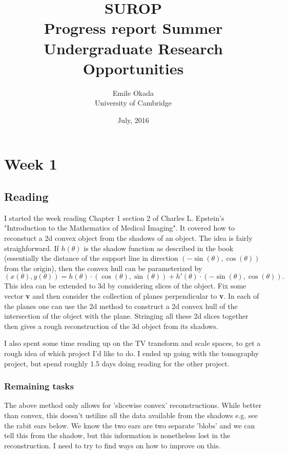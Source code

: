 \documentclass[a4paper]{article}
\begin{document}
\title{
    SUROP \\ Progress report
}
\title{Summer Undergraduate Research Opportunities}
\date{July, 2016}
\author{Emile Okada \\ University of Cambridge}
\maketitle

\newpage

\setcounter{section}{0}
\section{Week 1}
\subsection{Reading}
I started the week reading Chapter 1 section 2 of Charles L. Epstein's "Introduction to the Mathematics of Medical Imaging".
It covered how to reconstuct a 2d convex object from the shadows of an object. 
The idea is fairly straighforward. 
If $h(\theta)$ is the shadow function as described in the book (essentially the distance of the support line in direction $(-\sin(\theta),\cos(\theta))$ from the origin), then the convex hull can be parameterized by
\begin{equation}
    (x(\theta),y(\theta)) = h(\theta)\cdot(\cos(\theta),\sin(\theta))+h'(\theta)\cdot(-\sin(\theta),\cos(\theta)).
\end{equation}
This idea can be extended to 3d by considering slices of the object. 
Fix some vector {\bfseries v} and then consider the collection of planes perpendicular to {\bfseries v}. 
In each of the planes one can use the 2d method to construct a 2d convex hull of the intersection of the object with the plane. 
Stringing all these 2d slices together then gives a rough reconstruction of the 3d object from its shadows.

I also spent some time reading up on the TV transform and scale spaces, to get a rough idea of which project I'd like to do. 
I ended up going with the tomography project, but spend roughly 1.5 days doing reading for the other project.
\subsubsection{Remaining tasks}
The above method only allows for 'slicewise convex' reconstructions. While better than convex, this doesn't ustilize all the data available from the shadows e.g. see the rabit ears below. We know the two ears are two separate 'blobs' and we can tell this from the shadow, but this information is nonetheless lost in the reconstruction. I need to try to find ways on how to improve on this.
\end{document}
